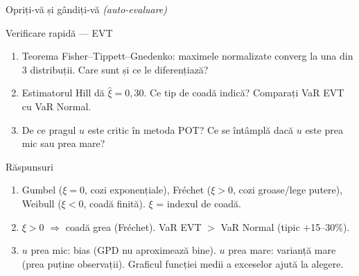 \documentclass[9pt, aspectratio=169, t]{beamer}
\theoremstyle{definition}
\begin{document}
\begin{frame}{Opriți-vă și gândiți-vă \hfill {\normalsize\textcolor{MediumGray}{\textit{(auto-evaluare)}}}}
\begin{alertblock}{Verificare rapidă --- EVT}
\begin{enumerate}\setlength\itemsep{4pt}
\item Teorema Fisher--Tippett--Gnedenko: maximele normalizate converg la una din 3 distribuții. Care sunt și ce le diferențiază?
\item Estimatorul Hill dă $\hat{\xi} = 0{,}30$. Ce tip de coadă indică? Comparați VaR EVT cu VaR Normal.
\item De ce pragul $u$ este critic în metoda POT? Ce se întâmplă dacă $u$ este prea mic sau prea mare?
\end{enumerate}
\end{alertblock}
\vspace{0.2cm}
\begin{exampleblock}{Răspunsuri}
\begin{enumerate}\setlength\itemsep{1pt}
\item Gumbel ($\xi = 0$, cozi exponențiale), Fréchet ($\xi > 0$, cozi groase/lege putere), Weibull ($\xi < 0$, coadă finită). $\xi$ = indexul de coadă.
\item $\xi > 0$ $\Rightarrow$ coadă grea (Fréchet). VaR EVT $>$ VaR Normal (tipic +15--30\%).
\item $u$ prea mic: bias (GPD nu aproximează bine). $u$ prea mare: varianță mare (prea puține observații). Graficul funcției medii a exceselor ajută la alegere.
\end{enumerate}
\end{exampleblock}
\end{frame}
\end{document}
